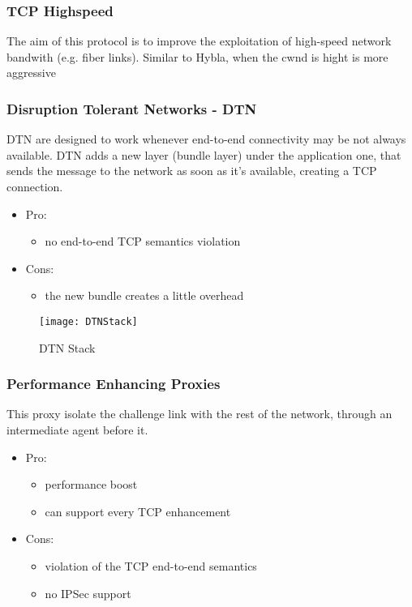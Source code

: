 \subsubsection{TCP Highspeed}
The aim of this protocol is to improve the exploitation of high-speed network
bandwith (e.g. fiber links). Similar to Hybla, when the cwnd is hight is more
aggressive

\subsubsection{Disruption Tolerant Networks - DTN}
DTN are designed to work whenever end-to-end connectivity may be not always
available. DTN adds a new layer (bundle layer) under the application one, that
sends the message to the network as soon as it's available, creating a TCP
connection.
\begin{itemize}
\item Pro:
  \begin{itemize}
    \item no end-to-end TCP semantics violation
  \end{itemize}
\item Cons:
  \begin{itemize}
    \item the new bundle creates a little overhead
  \end{itemize}
\end{itemize}

\begin{figure}[t]
  \centering
  \texttt{[image: DTNStack]}
  \caption{DTN Stack}
\end{figure}

\subsubsection{Performance Enhancing Proxies}
This proxy isolate the challenge link with the rest of the network, through an
intermediate agent before it.
\begin{itemize}
  \item Pro:
    \begin{itemize}
    \item performance boost
    \item can support every TCP enhancement
    \end{itemize}
  \item Cons:
    \begin{itemize}
    \item violation of the TCP end-to-end semantics
    \item no IPSec support
    \end{itemize}
\end{itemize}

